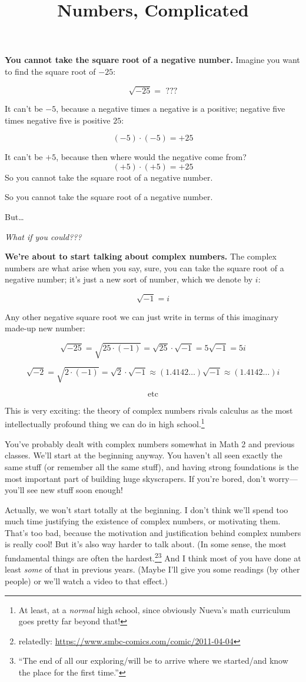 \documentclass[
]{article}
\title{Numbers, Complicated}
\author{}
\date{}
\begin{document}
\maketitle

\textbf{You cannot take the square root of a negative number.} Imagine
you want to find the square root of \(-25\):

\[\sqrt{-25} = \,\, ???\]

It can't be \(-5\), because a negative times a negative is a positive;
negative five times negative five is positive \(25\):

\[(-5)\cdot(-5) = +25\]

It can't be \(+5\), because then where would the negative come from?
\[(+5)\cdot(+5) = +25\] So you cannot take the square root of a negative
number.

So you cannot take the square root of a negative number.

But\ldots{}

\emph{What if you could???}

\textbf{We're about to start talking about complex numbers.} The complex
numbers are what arise when you say, sure, you can take the square root
of a negative number; it's just a new sort of number, which we denote by
\(i\):

\[ \sqrt{-1} = i \]

Any other negative square root we can just write in terms of this
imaginary made-up new number:

\[ \sqrt{-25} = \sqrt{25\cdot(-1)} = \sqrt{25}\cdot\sqrt{-1} = 5\sqrt{-1} = 5i \]

\[ \sqrt{-2} = \sqrt{2\cdot(-1)} = \sqrt{2}\cdot\sqrt{-1} \approx (1.4142\dots )\sqrt{-1} \approx (1.4142\dots )i \]

\[ \text{etc} \]

This is very exciting: the theory of complex numbers rivals calculus as
the most intellectually profound thing we can do in high
school.\footnote{At least, at a \emph{normal} high school, since
  obviously Nueva's math curriculum goes pretty far beyond that!}

You've probably dealt with complex numbers somewhat in Math 2 and
previous classes. We'll start at the beginning anyway. You haven't all
seen exactly the same stuff (or remember all the same stuff), and having
strong foundations is the most important part of building huge
skyscrapers. If you're bored, don't worry---you'll see new stuff soon
enough!

Actually, we won't start totally at the beginning. I don't think we'll
spend too much time justifying the existence of complex numbers, or
motivating them. That's too bad, because the motivation and
justification behind complex numbers is really cool! But it's also way
harder to talk about. (In some sense, the most fundamental things are
often the hardest.\footnote{relatedly:
  \href{https://www.smbc-comics.com/comic/2011-04-04\%5D}{https://www.smbc-comics.com/comic/2011-04-04}}\footnote{``The
  end of all our exploring/will be to arrive where we started/and know
  the place for the first time.''} And I think most of you have done at
least \emph{some} of that in previous years. (Maybe I'll give you some
readings (by other people) or we'll watch a video to that effect.)
\end{document}
